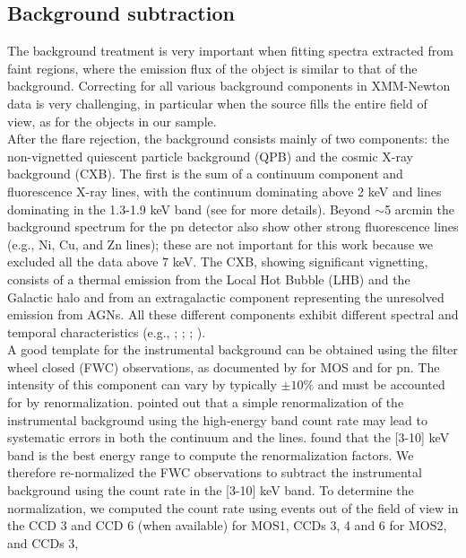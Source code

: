 \documentclass{aa} %
\begin{document}
\subsection{Background subtraction}
The background treatment is very important when fitting spectra
extracted from faint regions, where the emission flux of the object is
similar to that of the background. Correcting for all various background
components in XMM-Newton data is very challenging, in particular when
the source fills the entire field of view, as for the objects in our
sample.\\ After the flare rejection, the background consists mainly
of two components: the non-vignetted quiescent particle background
(QPB) and the cosmic X-ray background (CXB). The first is the sum of a
continuum component and fluorescence X-ray lines, with the continuum
dominating above 2 keV and lines dominating in the 1.3-1.9 keV band
(see \citealt{2008A&A...478..615S} for more details). Beyond $\sim$5 arcmin the background spectrum for the pn detector also show other strong fluorescence lines (e.g., Ni, Cu, and Zn lines); these are not important for this work because we excluded all the data above 7 keV. The CXB, showing
significant vignetting, consists of a thermal emission from the Local
Hot Bubble (LHB) and the Galactic halo and from an extragalactic component
representing the unresolved emission from AGNs. All these different
components exhibit different spectral and temporal characteristics
(e.g., \citealt{2002A&A...389...93L}; \citealt{2003A&A...409..395R};
\citealt{2008A&A...478..575K}; \citealt{2008A&A...478..615S}).\\
A good template for the instrumental background can be obtained using
the filter wheel closed (FWC) observations, as documented by
\citet{2008A&A...478..615S} for MOS and \cite{mekal...freyberg} for
pn. The intensity of this component can vary by typically $\pm10\%$
and must be accounted for by
renormalization. \citet{2004A&A...419..837D} pointed out that a simple
renormalization of the instrumental background using the high-energy
band count rate may lead to systematic errors in both the continuum
and the lines. \citet{2009ApJ...699.1178Z} found that the [3-10] keV
band is the best energy range to compute the renormalization
factors. We therefore re-normalized the FWC observations to
subtract the instrumental background using the count rate in the
[3-10] keV band. To determine the normalization, we computed the count
rate using events out of the field of view in the CCD 3 and
CCD 6 (when available) for MOS1, CCDs 3, 4 and 6 for MOS2, and CCDs 3,
\end{document}
